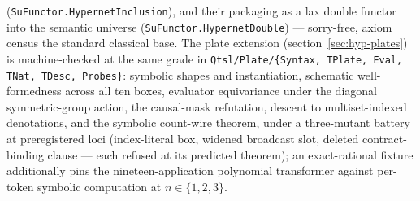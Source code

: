 (\texttt{SuFunctor.HypernetInclusion}), and their packaging as a lax
double functor into the semantic universe
(\texttt{SuFunctor.HypernetDouble}) --- sorry-free, axiom census the
standard classical base. The plate extension
(section~\ref{sec:hyp-plates}) is machine-checked at the same grade
in \texttt{Qtsl/Plate/\{Syntax, TPlate, Eval, TNat, TDesc,
Probes\}}: symbolic shapes and instantiation, schematic
well-formedness across all ten boxes, evaluator equivariance under
the diagonal symmetric-group action, the causal-mask refutation,
descent to multiset-indexed denotations, and the symbolic count-wire
theorem, under a three-mutant battery at preregistered loci
(index-literal box, widened broadcast slot, deleted contract-binding
clause --- each refused at its predicted theorem); an exact-rational
fixture additionally pins the nineteen-application polynomial
transformer against per-token symbolic computation at
$n \in \{1,2,3\}$.

